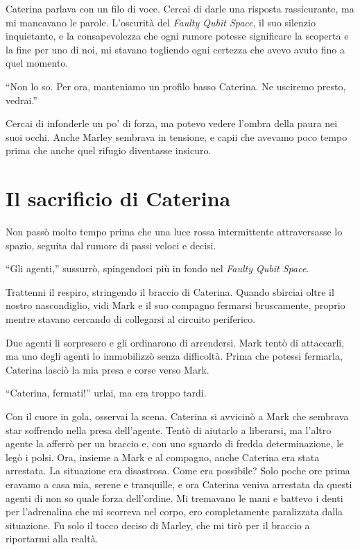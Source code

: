 Caterina parlava con un filo di voce.
Cercai di darle una risposta rassicurante, ma mi mancavano le parole. L'oscurità del \textit{Faulty Qubit Space}, il suo silenzio inquietante, e la consapevolezza che ogni rumore potesse significare la scoperta e la fine per uno di noi, mi stavano togliendo ogni certezza che avevo avuto fino a quel momento.

\begin{dialogue}
 ``Non lo so. Per ora, manteniamo un profilo basso Caterina. Ne usciremo presto, vedrai.''
\end{dialogue}

Cercai di infonderle un po’ di forza, ma potevo vedere l’ombra della paura nei suoi occhi. Anche Marley sembrava in tensione, e capii che avevamo poco tempo prima che anche quel rifugio diventasse insicuro.

\section{Il sacrificio di Caterina}
Non passò molto tempo prima che una luce rossa intermittente attraversasse lo spazio, seguita dal rumore di passi veloci e decisi. 

\begin{dialogue}
 \enquote{Gli agenti,} sussurrò, spingendoci più in fondo nel \textit{Faulty Qubit Space}.
\end{dialogue}

Trattenni il respiro, stringendo il braccio di Caterina. Quando sbirciai oltre il nostro nascondiglio, vidi Mark e il suo compagno fermarsi bruscamente, proprio mentre stavano cercando di collegarsi al circuito periferico.

Due agenti li sorpresero e gli ordinarono di arrendersi. Mark tentò di attaccarli, ma uno degli agenti lo immobilizzò senza difficoltà. Prima che potessi fermarla, Caterina lasciò la mia presa e corse verso Mark.

\begin{dialogue}
 \enquote{Caterina, fermati!}  urlai, ma era troppo tardi.
\end{dialogue}

Con il cuore in gola, osservai la scena. Caterina si avvicinò a Mark che sembrava star soffrendo nella presa dell'agente. Tentò di aiutarlo a liberarsi, ma l'altro agente la afferrò per un braccio e, con uno sguardo di fredda determinazione, le legò i polsi. Ora, insieme a Mark e al compagno, anche Caterina era stata arrestata. La situazione era disastrosa. Come era possibile? Solo poche ore prima eravamo a casa mia, serene e tranquille, e ora Caterina veniva arrestata da questi agenti di non so quale forza dell'ordine. Mi tremavano le mani e battevo i denti per l'adrenalina che mi scorreva nel corpo, ero completamente paralizzata dalla situazione. Fu solo il tocco deciso di Marley, che mi tirò per il braccio a riportarmi alla realtà.



